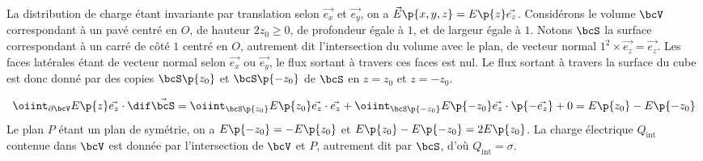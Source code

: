 \documentclass[a4paper,french,bookmarks]{article}
\begin{document}
\begin{enumerate}
{\begin{minipage}{0.45\linewidth}
\begin{center}
                \end{center}
            \end{minipage}
            \begin{minipage}{0.55\linewidth}
                La distribution de charge étant invariante par translation selon $\vec{e_x}$ et $\vec{e_y}$, on a $\vec E\p{x, y, z} = E\p{z}\vec{e_z}$. Considérons le volume $\bcV$ correspondant à un pavé centré en $O$, de hauteur $2z_0 \geq 0$, de profondeur égale à $1$, et de largeur égale à $1$. Notons $\bcS$ la surface correspondant à un carré de côté $1$ centré en $O$, autrement dit l'intersection du volume avec le plan, de vecteur normal $1^2\times\vec{e_z} = \vec{e_z}$. Les faces latérales étant de vecteur normal selon $\vec{e_x}$ ou $\vec{e_y}$, le flux sortant à travers ces faces est nul. Le flux sortant à travers la surface du cube est donc donné par des copies $\bcS\p{z_0}$ et $\bcS\p{-z_0}$ de $\bcS$ en $z = z_0$ et $z = -z_0$. 
            \end{minipage}
            \[ \oiint_{\partial \bcV} E\p{z}\vec{e_z} \cdot \dif \vec{\bcS} = \oiint_{\bcS\p{z_0}} E\p{z_0}\vec{e_z} \cdot \vec{e_z} + \oiint_{\bcS\p{-z_0}} E\p{-z_0}\vec{e_z} \cdot \p{-\vec{e_z}} + 0 = E\p{z_0} - E\p{-z_0}\]
            Le plan $P$ étant un plan de symétrie, on a $E\p{-z_0} = -E\p{z_0}$ et $E\p{z_0} - E\p{-z_0} = 2E\p{z_0}$. La charge électrique $Q_\text{int}$ contenue dans $\bcV$ est donnée par l'intersection de $\bcV$ et $P$, autrement dit par $\bcS$, d'où $Q_\text{int} = \sigma$. 
        }
        \yesafter
        \yesbefore
    \end{enumerate}
    
\end{document}
